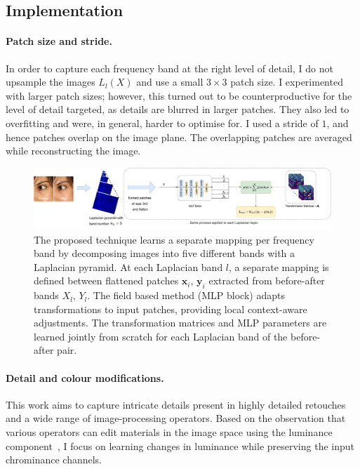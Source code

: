
\subsection{Implementation}
\label{sec:Implementation}

 \paragraph{Patch size and stride.} In order to capture each frequency band at the right level of detail, I do not upsample the images $L_l(X)$ and use a small $3 \times 3$ patch size. I experimented with larger patch sizes; however, this turned out to be counterproductive for the level of detail targeted, as details are blurred in larger patches. They also led to overfitting and were, in general, harder to optimise for. I used a stride of $1$, and hence patches overlap on the image plane. The overlapping patches are averaged while reconstructing the image.
 
 \begin{landscape}\centering
\vspace*{\fill}
\begin{figure}[htpb]
  \centering
  \includegraphics[width=1.5\textwidth]{Chapters/detail-retouching-figs/MainFig.pdf}
  \caption{The proposed technique learns a separate mapping per frequency band by decomposing images into five different bands with a Laplacian pyramid. At each Laplacian band $l$, a separate mapping is defined between flattened patches $\mathbf{x}_i$, $\mathbf{y}_i$ extracted from before-after bands $X_l$, $Y_l$. The field based method (MLP block) adapts transformations to input patches, providing local context-aware adjustments. The transformation matrices and MLP parameters are learned jointly from scratch for each Laplacian band of the before-after pair.}
 \label{fig:modelT}

\end{figure}
\vfill
\end{landscape}


\paragraph{Detail and colour modifications.} This work aims to capture intricate details present in highly detailed retouches and a wide range of image-processing operators. Based on the observation that various operators can edit materials in the image space using the luminance component~\cite{Boyadzhiev15Band}, I focus on learning changes in luminance while preserving the input chrominance channels.

